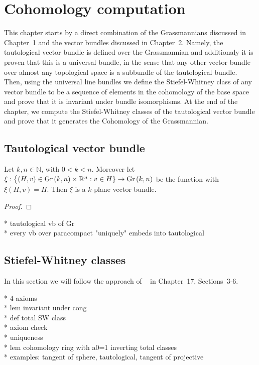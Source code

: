 \chapter{Cohomology computation}
This chapter starts by a direct combination of the Grassmannians discussed in Chapter~1 and the vector bundles discussed in Chapter~2. Namely, the tautological vector bundle is defined over the Grassmannian and additionaly it is proven that this is a universal bundle, in the sense that any other vector bundle over almost any topological space is a subbundle of the tautological bundle. Then, using the universal line bundles we define the Stiefel-Whitney class of any vector bundle to be a sequence of elements in the cohomology of the base space and prove that it is invariant under bundle isomorphisms. At the end of the chapter, we compute the Stiefel-Whitney classes of the tautological vector bundle and prove that it generates the Cohomology of the Grassmannian.

\section{Tautological vector bundle}
\begin{proposition} Let $k,n\in\mathbb{N}$, with $0<k<n$. Moreover let $\xi:\big\{(H,v)\in\Gr{k}{n}\times\mathbb{R}^n:v\in H\}\to\Gr{k}{n}$ be the function with $\xi(H,v)=H$. Then $\xi$ is a $k$-plane vector bundle.
\end{proposition}
\begin{proof}
\end{proof}

* tautological vb of Gr\\
* every vb over paracompact "uniquely" embeds into tautological

\section{Stiefel-Whitney classes}
In this section we will follow the approach of ~\cite{husemoller} in Chapter~17, Sections~3-6.


* 4 axioms\\
* lem invariant under cong\\
* def total SW class\\
* axiom check\\
* uniqueness\\
* lem cohomology ring with a0=1 inverting total classes\\
* examples: tangent of sphere, tautological, tangent of projective



